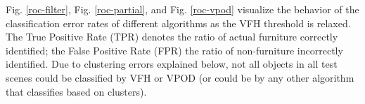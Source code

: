 \documentclass[letterpaper, 10pt, conference]{ieeeconf}
\begin{document}

Fig. \ref{roc-filter}, Fig. \ref{roc-partial}, and Fig. \ref{roc-vpod} visualize
the behavior of the classification error rates of different algorithms as the VFH threshold is relaxed. 
The True Positive Rate (TPR) denotes the ratio of actual furniture correctly
identified; the False Positive Rate (FPR) the ratio of non-furniture incorrectly identified. 
Due to clustering errors explained below, not all objects in all test scenes
could be classified by VFH or VPOD (or could be by any other algorithm that
classifies based on clusters).
\end{document}
